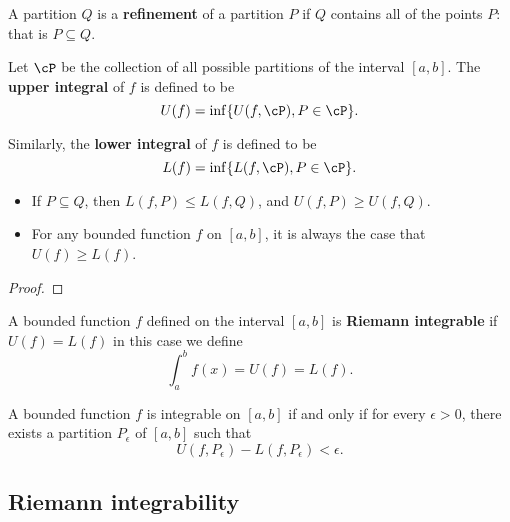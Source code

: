 \begin{refsection}
\begin{definition}
A partition $Q$ is a \textbf{refinement} of a partition $P$ if $Q$ contains all of the points $P$: that is $P\subseteq Q$.	
\end{definition}

\begin{definition}\cite[220]{abbott2001understanding}
Let $\cP$ be the collection of all possible partitions of the interval $[a,b]$. The \textbf{upper integral} of $f$ is defined to be
$$U(f) = \inf\{U(f,\cP),P\in \cP\}.$$

Similarly, the \textbf{lower integral} of $f$ is defined to be
$$L(f) = \inf\{L(f,\cP),P\in \cP\}.$$


\end{definition}


\begin{lemma}\cite[220]{abbott2001understanding}\hfill
\begin{itemize}
	\item 	If $P\subseteq Q$, then $L(f,P)\leq L(f,Q)$, and $U(f,P)\geq U(f,Q)$.
	\item For any bounded function $f$ on $[a,b]$, it is always the case that $U(f)\geq L(f)$.
\end{itemize}	
\end{lemma}
\begin{proof}

\end{proof}




\begin{definition}
A bounded function $f$ defined on the interval $[a,b]$ is \textbf{Riemann integrable} if $U(f) = L(f)$ in this case we define $$\int_a^b f(x) = U(f) = L(f).$$	
\end{definition}


\begin{theorem}\cite[221]{abbott2001understanding}
A bounded function $f$ is integrable on $[a,b]$ if and only if for every $\epsilon > 0$, there exists a partition $P_\epsilon$ of $[a,b]$ such that
$$U(f,P_\epsilon) - L(f,P_\epsilon) < \epsilon.$$	
\end{theorem}



\subsection{Riemann integrability}

\end{refsection}
